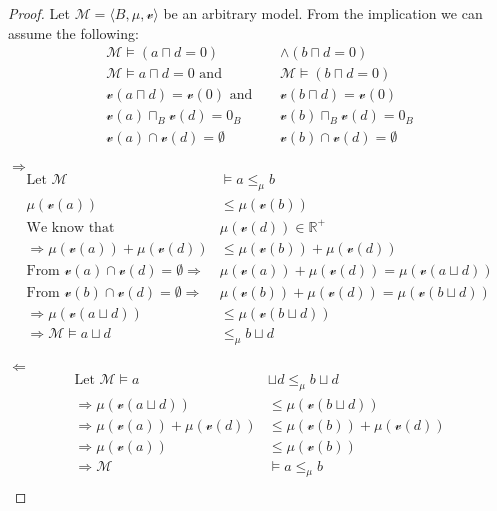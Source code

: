 \documentclass{article}
\begin{document}
\begin{proof}
Let $\mathcal{M} = \langle B, \mu, \mathscr{v}\rangle$ be an arbitrary model. From the implication we can assume the following:
	\begin{align*}
		\mathcal{M} \models (a \sqcap d = 0) &\land (b \sqcap d = 0) \\
		\mathcal{M} \models a \sqcap d = 0 \text{ and }& \mathcal{M} \models (b \sqcap d = 0) \\
		\mathscr{v}(a \sqcap d) = \mathscr{v}(0) \text{ and }& \mathscr{v}(b \sqcap d) = \mathscr{v}(0) \\ 
		\mathscr{v}(a) \sqcap_B \mathscr{v}(d) = 0_B  \;\;\;\;\;\;\;& \mathscr{v}(b) \sqcap_B \mathscr{v}(d) = 0_B  \\
		\mathscr{v}(a) \cap \mathscr{v}(d) = \emptyset  \;\;\;\;\;\;\;& \mathscr{v}(b) \cap \mathscr{v}(d) = \emptyset
	\end{align*}

$\Longrightarrow$
	\begin{align*} 
		\text{Let } \mathcal{M} &\models  a \le_\mu b \\
		\mu(\mathscr{v}(a)) &\le \mu(\mathscr{v}(b)) \\
		\text{We know that } & \mu(\mathscr{v}(d)) \in \mathbb{R}^+ \\
		\Rightarrow \mu(\mathscr{v}(a)) +  \mu(\mathscr{v}(d)) &\le \mu(\mathscr{v}(b)) +  \mu(\mathscr{v}(d)) \\
		\text{From } \mathscr{v}(a) \cap \mathscr{v}(d) = \emptyset \Rightarrow & \mu(\mathscr{v}(a)) +  \mu(\mathscr{v}(d)) = \mu(\mathscr{v}(a \sqcup d)) \\
		\text{From } \mathscr{v}(b) \cap \mathscr{v}(d) = \emptyset \Rightarrow & \mu(\mathscr{v}(b)) +  \mu(\mathscr{v}(d)) = \mu(\mathscr{v}(b \sqcup d)) \\
		\Rightarrow \mu(\mathscr{v}(a \sqcup d)) &\le \mu(\mathscr{v}(b \sqcup d)) \\
		\Rightarrow \mathcal{M} \models  a \sqcup d &\le_\mu b \sqcup d
	\end{align*}

$\Longleftarrow$
	\begin{align*} 
		\text{Let } \mathcal{M} \models  a &\sqcup d \le_\mu b \sqcup d \\
		\Rightarrow \mu(\mathscr{v}(a \sqcup d)) &\le \mu(\mathscr{v}(b \sqcup d)) \\
		\Rightarrow \mu(\mathscr{v}(a)) +  \mu(\mathscr{v}(d)) &\le \mu(\mathscr{v}(b)) +  \mu(\mathscr{v}(d)) \\
		\Rightarrow \mu(\mathscr{v}(a)) &\le \mu(\mathscr{v}(b)) \\
		\Rightarrow \mathcal{M} &\models  a \le_\mu b \\
	\end{align*}
\end{proof}
\end{document}
